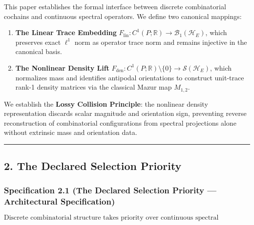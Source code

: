 \documentclass[
  10pt,
]{article}
\begin{document}
This paper establishes the formal interface between discrete combinatorial cochains and continuous spectral operators. We define two canonical mappings:

\begin{enumerate}
\def\labelenumi{\arabic{enumi}.}
\item
  \textbf{The Linear Trace Embedding} \protect\hypertarget{math-E0011-0001}{}{\(F_{\mathrm{lin}}: C^1(P; \mathbb{R}) \to \mathcal{B}_1(\mathcal{H}_E)\)}, which preserves exact \protect\hypertarget{math-E0001-0002}{}{\(\ell^1\)} norm as operator trace norm and remains injective in the canonical basis.
\item
  \textbf{The Nonlinear Density Lift} \protect\hypertarget{math-E0012-0003}{}{\(F_{\mathrm{den}}: C^1(P; \mathbb{R}) \setminus \{0\} \to \mathcal{S}(\mathcal{H}_E)\)}, which normalizes mass and identifies antipodal orientations to construct unit-trace rank-1 density matrices via the classical Mazur map \protect\hypertarget{math-E0009-0004}{}{\(M_{1,2}\)}.
\end{enumerate}

We establish the \textbf{Lossy Collision Principle}: the nonlinear density representation discards scalar magnitude and orientation sign, preventing reverse reconstruction of combinatorial configurations from spectral projections alone without extrinsic mass and orientation data.

\begin{center}\rule{0.5\linewidth}{0.5pt}\end{center}

\subsection{2. The Declared Selection Priority}\label{the-declared-selection-priority}

\subsubsection{Specification 2.1 (The Declared Selection Priority --- Architectural Specification)}\label{specification-2.1-the-declared-selection-priority-architectural-specification}

\protect\hypertarget{math-E0013-0005}{}{\[\boxed{\text{Discrete combinatorial structure takes priority over continuous spectral representations.}}\]}
\end{document}
